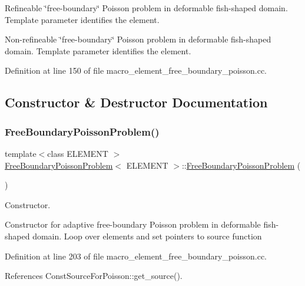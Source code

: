 Refineable \char`\"{}free-\/boundary\char`\"{} Poisson problem in deformable fish-\/shaped domain. Template parameter identifies the element.

Non-\/refineable \char`\"{}free-\/boundary\char`\"{} Poisson problem in deformable fish-\/shaped domain. Template parameter identifies the element. 

Definition at line 150 of file macro\+\_\+element\+\_\+free\+\_\+boundary\+\_\+poisson.\+cc.



\subsection{Constructor \& Destructor Documentation}
\mbox{\label{classFreeBoundaryPoissonProblem_a0efe7c342eea790fc0240830bc3c4ebc}} 
\subsubsection{\texorpdfstring{Free\+Boundary\+Poisson\+Problem()}{FreeBoundaryPoissonProblem()}\hspace{0.1cm}{\footnotesize\ttfamily [1/2]}}
{\footnotesize\ttfamily template$<$class E\+L\+E\+M\+E\+NT $>$ \\
\hyperlink{classFreeBoundaryPoissonProblem}{Free\+Boundary\+Poisson\+Problem}$<$ E\+L\+E\+M\+E\+NT $>$\+::\hyperlink{classFreeBoundaryPoissonProblem}{Free\+Boundary\+Poisson\+Problem} (\begin{DoxyParamCaption}{ }\end{DoxyParamCaption})}



Constructor. 

Constructor for adaptive free-\/boundary Poisson problem in deformable fish-\/shaped domain. Loop over elements and set pointers to source function 

Definition at line 203 of file macro\+\_\+element\+\_\+free\+\_\+boundary\+\_\+poisson.\+cc.



References Const\+Source\+For\+Poisson\+::get\+\_\+source().

\mbox{\label{classFreeBoundaryPoissonProblem_a5b75b8553f3dfed4e9a8996c1b13edf3}} 
